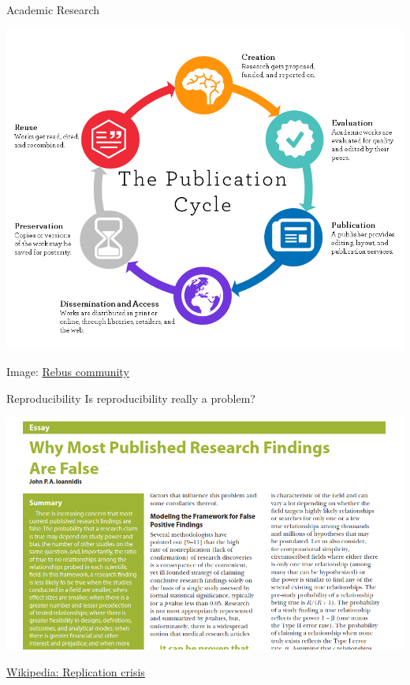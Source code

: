 \documentclass{beamer} %
\begin{document}
  \begin{frame}[label=RESEARCH]{Academic Research}
    \begin{center}
      \includegraphics[height=.8\textheight]{publication_cycle.png}
    \end{center}
    \tiny{Image: \href{https://press.rebus.community/literaturereviewsedunursing/chapter/chapter-2-what-is-a-literature-review/}{Rebus community}}
  \end{frame}

  \begin{frame}[label=REPRO]{Reproducibility}
    Is reproducibility really a problem?
    \pause
    \begin{center}
      \includegraphics[height=.7\textheight]{ioannidis.png}
    \end{center}
    \href{https://en.wikipedia.org/wiki/Replication_crisis}{Wikipedia: \underline{Replication crisis}}
  \end{frame}
\end{document}
